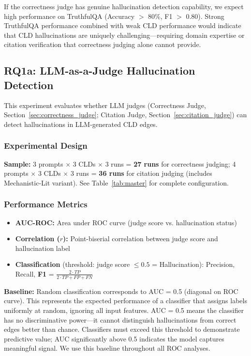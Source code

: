 If the correctness judge has genuine hallucination detection capability, we expect high performance on TruthfulQA (Accuracy $>$ 80\%, F1 $>$ 0.80). Strong TruthfulQA performance combined with weak CLD performance would indicate that CLD hallucinations are uniquely challenging---requiring domain expertise or citation verification that correctness judging alone cannot provide.

\subsection{RQ1a: LLM-as-a-Judge Hallucination Detection}

This experiment evaluates whether LLM judges (Correctness Judge, Section~\ref{sec:correctness_judge}; Citation Judge, Section~\ref{sec:citation_judge}) can detect hallucinations in LLM-generated CLD edges.

\subsubsection{Experimental Design}
\textbf{Sample:} 3 prompts $\times$ 3 CLDs $\times$ 3 runs = \textbf{27 runs} for correctness judging; 4 prompts $\times$ 3 CLDs $\times$ 3 runs = \textbf{36 runs} for citation judging (includes Mechanistic-Lit variant). See Table~\ref{tab:master} for complete configuration.

\subsubsection{Performance Metrics}
\begin{itemize}[noitemsep]
    \item \textbf{AUC-ROC:} Area under ROC curve (judge score vs. hallucination status)
    \item \textbf{Correlation ($r$):} Point-biserial correlation between judge score and hallucination label
    \item \textbf{Classification} (threshold: judge score $\leq 0.5$ = Hallucination): Precision, Recall, \textbf{F1} = $\frac{2 \cdot TP}{2 \cdot TP + FP + FN}$
\end{itemize}

\textbf{Baseline:} Random classification corresponds to AUC = 0.5 (diagonal on ROC curve). This represents the expected performance of a classifier that assigns labels uniformly at random, ignoring all input features. AUC = 0.5 means the classifier has no discriminative power---it cannot distinguish hallucinations from correct edges better than chance. Classifiers must exceed this threshold to demonstrate predictive value; AUC significantly above 0.5 indicates the model captures meaningful signal. We use this baseline throughout all ROC analyses.

